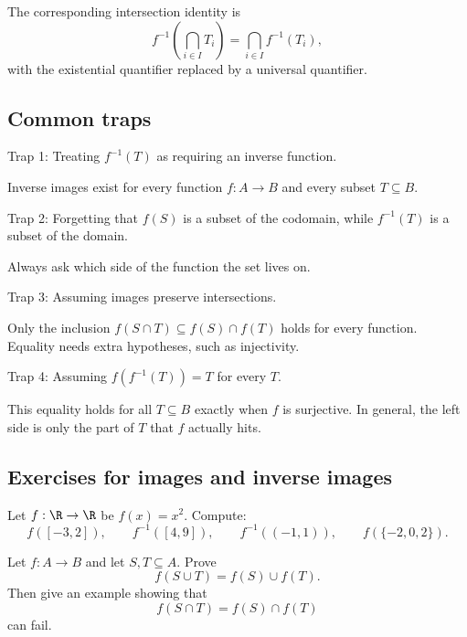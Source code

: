 The corresponding intersection identity is
\[
f^{-1}\left(\bigcap_{i\in I}T_i\right)=\bigcap_{i\in I}f^{-1}(T_i),
\]
with the existential quantifier replaced by a universal quantifier.

\subsection{Common traps}

\begin{trapbox}
Trap 1: Treating $f^{-1}(T)$ as requiring an inverse function.

Inverse images exist for every function $f:A\to B$ and every subset $T\subseteq B$.
\end{trapbox}

\begin{trapbox}
Trap 2: Forgetting that $f(S)$ is a subset of the codomain, while $f^{-1}(T)$ is a subset of the domain.

Always ask which side of the function the set lives on.
\end{trapbox}

\begin{trapbox}
Trap 3: Assuming images preserve intersections.

Only the inclusion $f(S\cap T)\subseteq f(S)\cap f(T)$ holds for every function. Equality needs extra hypotheses, such as injectivity.
\end{trapbox}

\begin{trapbox}
Trap 4: Assuming $f(f^{-1}(T))=T$ for every $T$.

This equality holds for all $T\subseteq B$ exactly when $f$ is surjective. In general, the left side is only the part of $T$ that $f$ actually hits.
\end{trapbox}

\subsection{Exercises for images and inverse images}

\begin{exercise}
Let $f:\R\to\R$ be $f(x)=x^2$. Compute:
\[
f([-3,2]),\qquad f^{-1}([4,9]),\qquad f^{-1}((-1,1)),\qquad f(\{-2,0,2\}).
\]
\end{exercise}

\begin{exercise}
Let $f:A\to B$ and let $S,T\subseteq A$. Prove
\[
f(S\cup T)=f(S)\cup f(T).
\]
Then give an example showing that
\[
f(S\cap T)=f(S)\cap f(T)
\]
can fail.
\end{exercise}

